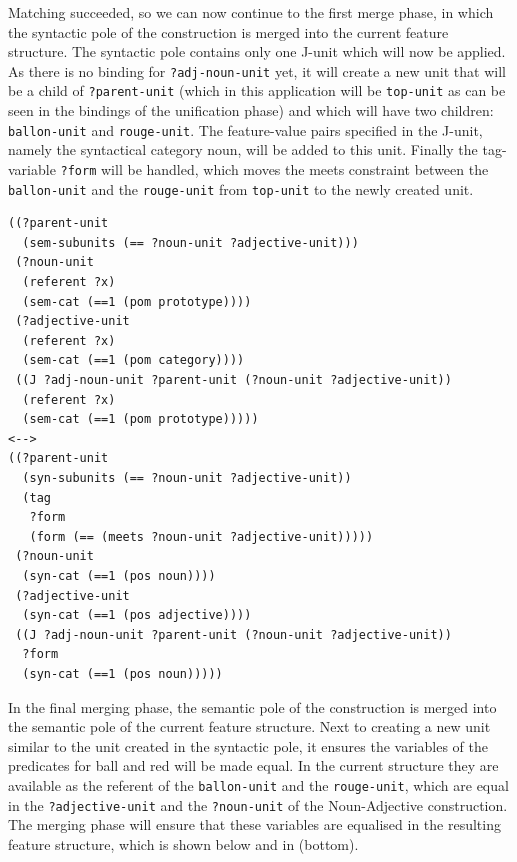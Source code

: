Matching succeeded, so we can now continue to the first merge phase,
in which the syntactic pole of the construction is merged into the
current feature structure. The syntactic pole contains only one J-unit
which will now be applied. As there is no binding for
{\footnotesize\tt ?adj-noun-unit} yet, it will create a new unit that will be a
child of {\footnotesize\tt ?parent-unit} (which in this application will be {\footnotesize\tt top-unit} as can be seen in the bindings of the unification
phase) and which will have two children: {\footnotesize\tt ballon-unit} and
{\footnotesize\tt rouge-unit}. The feature-value pairs specified in the J-unit,
namely the syntactical category noun, will be added to this
unit. Finally the tag-variable {\footnotesize\tt ?form} will be handled, which
moves the meets constraint between the {\footnotesize\tt ballon-unit} and the
{\footnotesize\tt rouge-unit} from {\footnotesize\tt top-unit} to the newly created unit.

\footnotesize
{}
\begin{lstlisting}
((?parent-unit
  (sem-subunits (== ?noun-unit ?adjective-unit)))
 (?noun-unit 
  (referent ?x) 
  (sem-cat (==1 (pom prototype))))
 (?adjective-unit
  (referent ?x)
  (sem-cat (==1 (pom category))))
 ((J ?adj-noun-unit ?parent-unit (?noun-unit ?adjective-unit))
  (referent ?x)
  (sem-cat (==1 (pom prototype)))))
<-->
((?parent-unit
  (syn-subunits (== ?noun-unit ?adjective-unit))
  (tag
   ?form
   (form (== (meets ?noun-unit ?adjective-unit)))))
 (?noun-unit 
  (syn-cat (==1 (pos noun))))
 (?adjective-unit 
  (syn-cat (==1 (pos adjective))))
 ((J ?adj-noun-unit ?parent-unit (?noun-unit ?adjective-unit))
  ?form
  (syn-cat (==1 (pos noun)))))
\end{lstlisting}
\normalsize

In the final merging phase, the semantic pole of the construction is
merged into the semantic pole of the current feature structure. Next
to creating a new unit similar to the unit created in the syntactic
pole, it ensures the variables of the predicates for ball and red will
be made equal. In the current structure they are available as the
referent of the {\footnotesize\tt ballon-unit} and the {\footnotesize\tt rouge-unit}, which
are equal in the {\footnotesize\tt ?adjective-unit} and the {\footnotesize\tt ?noun-unit} of
the Noun-Adjective construction. The merging phase will ensure that
these variables are equalised in the resulting feature structure,
which is shown below and in 
(bottom).

